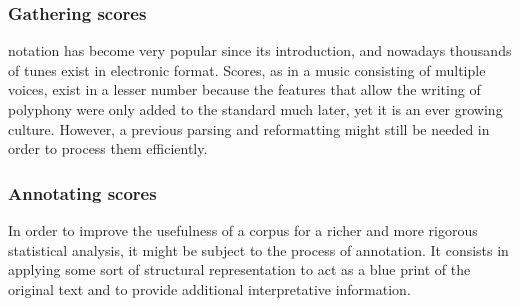 
% 

\subsubsection*{Gathering scores}

\abc{} notation has become very popular since its introduction, and nowadays thousands of tunes
exist in electronic format. Scores, as in a music consisting of multiple voices, exist in a lesser
number because the features that allow the writing of polyphony were only added to the standard much
later, yet it is an ever growing culture. However, a previous parsing and reformatting might still
be needed in order to process them efficiently.

\subsubsection*{Annotating scores}

In order to improve the usefulness of a corpus for a richer and more rigorous statistical analysis,
it might be subject to the process of annotation. It consists in applying some sort of structural
representation to act as a blue print of the original text and to provide additional interpretative
information.



